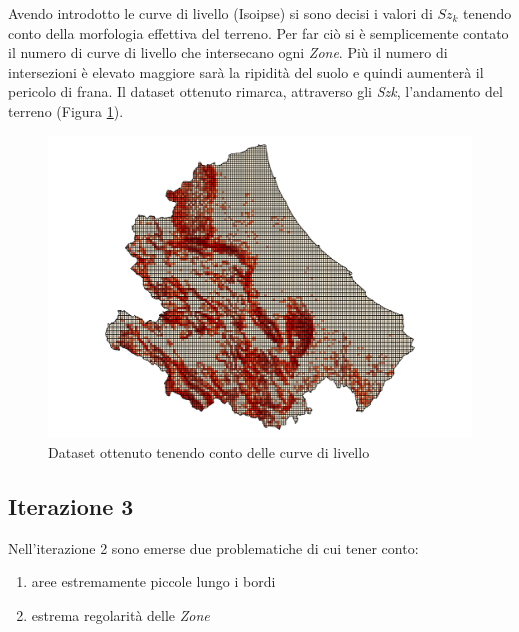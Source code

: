 Avendo introdotto le curve di livello (Isoipse) si sono decisi i valori di $Sz_k$ tenendo conto della morfologia effettiva del terreno. 
Per far ciò si è semplicemente contato il numero di curve di livello che intersecano ogni \textit{Zone}. Più il numero di intersezioni è elevato maggiore sarà la ripidità del suolo e quindi aumenterà il pericolo di frana. Il dataset ottenuto rimarca, attraverso gli \textit{Szk}, l'andamento del terreno (Figura \ref{fig:dataset_it_2}).

\begin{figure}[H]
	\centering
	\includegraphics[width=1\textwidth]{images/abruzzoZKquadretto.png}
	\caption{Dataset ottenuto tenendo conto delle curve di livello}
	\label{fig:dataset_it_2}
\end{figure}


\subsection{\textbf{Iterazione 3}}

Nell'iterazione 2 sono emerse due problematiche di cui tener conto:

\begin{enumerate}
	\item aree estremamente piccole lungo i bordi
	\item estrema regolarità delle \textit{Zone}
\end{enumerate}

